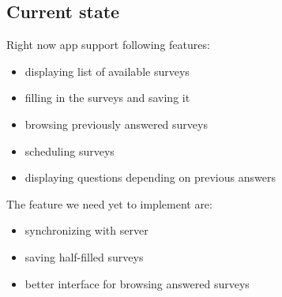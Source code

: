 \subsection{Current state}
Right now app support following features:
\begin{itemize}
\item displaying list of available surveys
\item filling in the surveys and saving it
\item browsing previously answered surveys
\item scheduling surveys
\item displaying questions depending on previous answers
\end{itemize}

The feature we need yet to implement are:
\begin{itemize}
\item synchronizing with server
\item saving half-filled surveys
\item better interface for browsing answered surveys
\end{itemize}